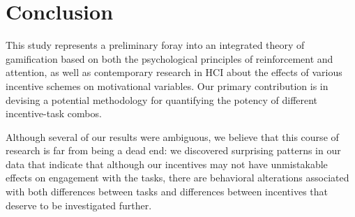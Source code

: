 \section{Conclusion}
This study represents a preliminary foray into an integrated theory of gamification based on both the psychological principles of reinforcement and attention, as well as contemporary research in HCI about the effects of various incentive schemes on motivational variables. Our primary contribution is in devising a potential methodology for quantifying the potency of different incentive-task combos.

Although several of our results were ambiguous, we believe that this course of research is far from being a dead end: we discovered surprising patterns in our data that indicate that although our incentives may not have unmistakable effects on engagement with the tasks, there are behavioral alterations associated with both differences between tasks and differences between incentives that deserve to be investigated further.
